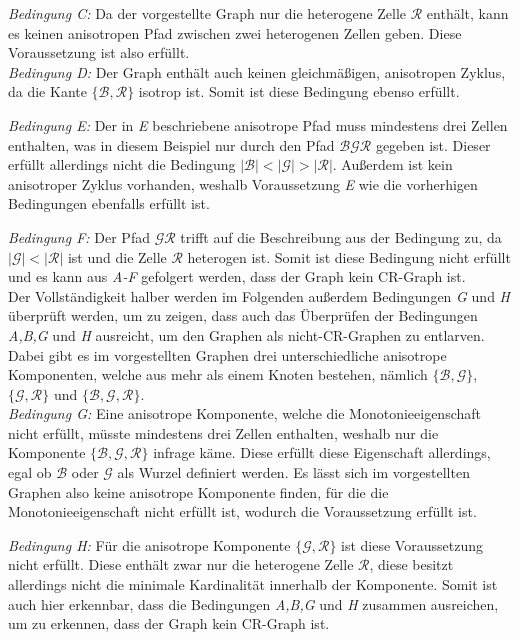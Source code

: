 \emph{Bedingung C:} Da der vorgestellte Graph nur die heterogene Zelle $\mathcal{R}$ enthält, kann es keinen anisotropen Pfad zwischen zwei heterogenen Zellen geben.
Diese Voraussetzung ist also erfüllt.\\

\emph{Bedingung D:} Der Graph enthält auch keinen gleichmäßigen, anisotropen Zyklus, da die Kante $\{\mathcal{B},\mathcal{R}\}$ isotrop ist.
Somit ist diese Bedingung ebenso erfüllt.

\emph{Bedingung E:} Der in \emph{E} beschriebene anisotrope Pfad muss mindestens drei Zellen enthalten, was in diesem Beispiel nur durch den Pfad $\mathcal{B}\mathcal{G}\mathcal{R}$ gegeben ist.
Dieser erfüllt allerdings nicht die Bedingung $|\mathcal{B}|<|\mathcal{G}|>|\mathcal{R}|$.
Außerdem ist kein anisotroper Zyklus vorhanden, weshalb Voraussetzung \emph{E} wie die vorherhigen Bedingungen ebenfalls erfüllt ist.

\emph{Bedingung F:} Der Pfad $\mathcal{G}\mathcal{R}$ trifft auf die Beschreibung aus der Bedingung zu, da $|\mathcal{G}|<|\mathcal{R}|$ ist und die Zelle $\mathcal{R}$ heterogen ist.
Somit ist diese Bedingung nicht erfüllt und es kann aus \emph{A-F} gefolgert werden, dass der Graph kein CR-Graph ist.\\

Der Vollständigkeit halber werden im Folgenden außerdem Bedingungen \emph{G} und \emph{H} überprüft werden, um zu zeigen, dass auch das Überprüfen der Bedingungen \emph{A,B,G} und \emph{H} ausreicht, um den Graphen als nicht-CR-Graphen zu entlarven.
Dabei gibt es im vorgestellten Graphen drei unterschiedliche anisotrope Komponenten, welche aus mehr als einem Knoten bestehen, nämlich $\{\mathcal{B},\mathcal{G}\}$, $\{\mathcal{G},\mathcal{R}\}$ und $\{\mathcal{B},\mathcal{G},\mathcal{R}\}$.\\

\emph{Bedingung G:} Eine anisotrope Komponente, welche die Monotonieeigenschaft nicht erfüllt, müsste mindestens drei Zellen enthalten, weshalb nur die Komponente $\{\mathcal{B},\mathcal{G},\mathcal{R}\}$ infrage käme.
Diese erfüllt diese Eigenschaft allerdings, egal ob $\mathcal{B}$ oder $\mathcal{G}$ als Wurzel definiert werden.
Es lässt sich im vorgestellten Graphen also keine anisotrope Komponente finden, für die die Monotonieeigenschaft nicht erfüllt ist, wodurch die Voraussetzung erfüllt ist.

\emph{Bedingung H:} Für die anisotrope Komponente $\{\mathcal{G},\mathcal{R}\}$ ist diese Voraussetzung nicht erfüllt.
Diese enthält zwar nur die heterogene Zelle $\mathcal{R}$, diese besitzt allerdings nicht die minimale Kardinalität innerhalb der Komponente.
Somit ist auch hier erkennbar, dass die Bedingungen \emph{A,B,G} und \emph{H} zusammen ausreichen, um zu erkennen, dass der Graph kein CR-Graph ist.

